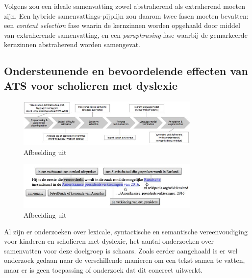 \medspace

Volgens \textcite{Hsu2018, Huang2019} zou een ideale samenvatting zowel abstraherend als extraherend moeten zijn. Een hybride samenvattings-pijplijn zou daarom twee fasen moeten bevatten: een \textit{content selection} fase waarin de kernzinnen worden opgehaald door middel van extraherende samenvatting, en een \textit{paraphrasing}-fase waarbij de gemarkeerde kernzinnen abstraherend worden samengevat.

\subsection{Ondersteunende en bevoordelende effecten van ATS voor scholieren met dyslexie}


\begin{figure}[H]
	\begin{center}
		\includegraphics[width=9cm]{img/dutch-simplification-dyslexia-pipeline.png}
	\end{center}
	\caption{Afbeelding uit \textcite{Bulte2018}}
	\label{img:dyslexia-bulte-pipeline}
\end{figure}

\begin{figure}[H]
	\begin{center}
		\includegraphics[width=9cm]{img/dutch-simplification-dyslexia-example.png}
	\end{center}
	\caption{Afbeelding uit \textcite{Bulte2018}}
	\label{img:dyslexia-bulte-example}
\end{figure}


Al zijn er onderzoeken over lexicale, syntactische en semantische vereenvoudiging voor kinderen en scholieren met dyslexie, het aantal onderzoeken over samenvatten voor deze doelgroep is schaars. Zoals eerder aangehaald is er wel onderzoek gedaan naar de verschillende manieren om een tekst samen te vatten, maar er is geen toepassing of onderzoek dat dit concreet uitwerkt. 

